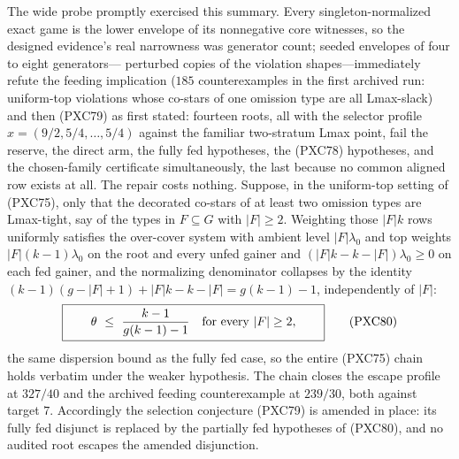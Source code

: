 \documentclass[11pt]{article}
\begin{document}
The wide probe promptly exercised this summary.  Every
singleton-normalized exact game is the lower envelope of its
nonnegative core witnesses, so the designed evidence's real narrowness
was generator count; seeded envelopes of four to eight generators---
perturbed copies of the violation shapes---immediately refute the
feeding implication ($185$ counterexamples in the first archived run:
uniform-top violations whose co-stars of one omission type are all
Lmax-slack) and then (PXC79) as first stated: fourteen roots, all with
the selector profile $x=(9/2,5/4,\dots,5/4)$ against the familiar
two-stratum Lmax point, fail the reserve, the direct arm, the fully fed
hypotheses, the (PXC78) hypotheses, and the chosen-family certificate
simultaneously, the last because no common aligned row exists at all.
The repair costs nothing.  Suppose, in the uniform-top setting of
(PXC75), only that the decorated co-stars of at least two omission
types are Lmax-tight, say of the types in $F\subseteq G$ with
$|F|\ge2$.  Weighting those $|F|k$ rows uniformly satisfies the
over-cover system with ambient level $|F|\lambda_0$ and top weights
$|F|(k-1)\lambda_0$ on the root and every unfed gainer and
$(|F|k-k-|F|)\lambda_0\ge0$ on each fed gainer, and the normalizing
denominator collapses by the identity
$(k-1)(g-|F|+1)+|F|k-k-|F|=g(k-1)-1$, independently of $|F|$:
\[
 \boxed{\qquad
 \theta\ \le\ \frac{k-1}{g(k-1)-1}
 \quad\hbox{for every }|F|\ge2,
 \qquad}                                             \tag{PXC80}
\]
the same dispersion bound as the fully fed case, so the entire (PXC75)
chain holds verbatim under the weaker hypothesis.  The chain closes the
escape profile at $327/40$ and the archived feeding counterexample at
$239/30$, both against target $7$.  Accordingly the selection
conjecture (PXC79) is amended in place: its fully fed disjunct is
replaced by the partially fed hypotheses of (PXC80), and no audited
root escapes the amended disjunction.
\end{document}
